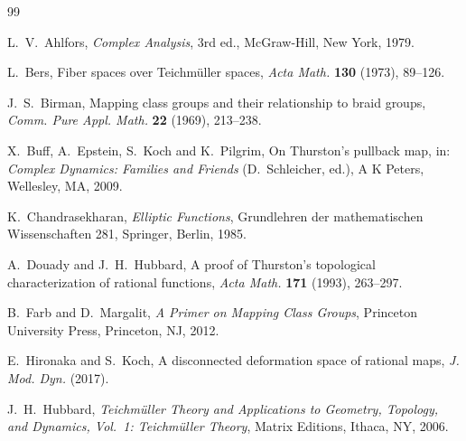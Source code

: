 \documentclass[11pt]{article}
\theoremstyle{definition}
\begin{document}
\begin{thebibliography}{99}

 L.~V.~Ahlfors, \emph{Complex Analysis}, 3rd ed., McGraw-Hill, New York, 1979.

 L.~Bers, Fiber spaces over Teichm\"uller spaces, \emph{Acta Math.} \textbf{130} (1973), 89--126.

 J.~S.~Birman, Mapping class groups and their relationship to braid groups, \emph{Comm. Pure Appl. Math.} \textbf{22} (1969), 213--238.

 X.~Buff, A.~Epstein, S.~Koch and K.~Pilgrim, On Thurston's pullback map, in: \emph{Complex Dynamics: Families and Friends} (D.~Schleicher, ed.), A K Peters, Wellesley, MA, 2009.

 K.~Chandrasekharan, \emph{Elliptic Functions}, Grundlehren der mathematischen Wissenschaften 281, Springer, Berlin, 1985.

 A.~Douady and J.~H.~Hubbard, A proof of Thurston's topological characterization of rational functions, \emph{Acta Math.} \textbf{171} (1993), 263--297.

 B.~Farb and D.~Margalit, \emph{A Primer on Mapping Class Groups}, Princeton University Press, Princeton, NJ, 2012.

 E.~Hironaka and S.~Koch, A disconnected deformation space of rational maps, \emph{J. Mod. Dyn.} (2017).

 J.~H.~Hubbard, \emph{Teichm\"uller Theory and Applications to Geometry, Topology, and Dynamics, Vol.~1: Teichm\"uller Theory}, Matrix Editions, Ithaca, NY, 2006.

\end{thebibliography}
\end{document}
